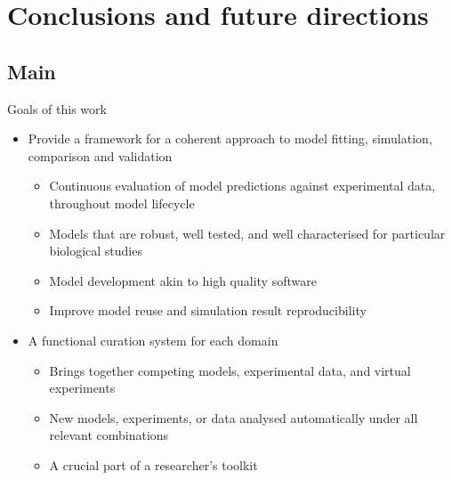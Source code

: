 \documentclass[t,xcolor={usenames,dvipsnames}]{beamer}
\begin{document}
\section{Conclusions and future directions}
\subsection*{Main}

\begin{frame}{Goals of this work}
\begin{itemize}[<+->]
\item Provide a framework for a coherent approach to model fitting, simulation, comparison and validation
  \begin{itemize}[<.->]
  \item Continuous evaluation of model predictions against experimental data, throughout model lifecycle
  \item Models that are robust, well tested, and well characterised for particular biological studies
  \item Model development akin to high quality software
  \item Improve model reuse and simulation result reproducibility
  \end{itemize}
\item A functional curation system \alert{for each domain}
  \begin{itemize}[<.->]
  \item Brings together competing models, experimental data, and virtual experiments
  \item New models, experiments, or data analysed automatically under all relevant combinations
  \item \alert{A crucial part of a researcher's toolkit}
  \end{itemize}
\end{itemize}
\end{frame}
\end{document}

